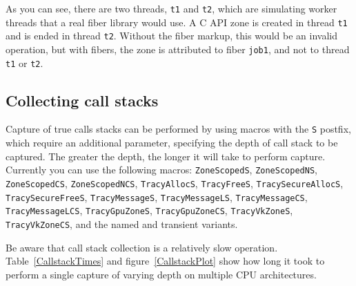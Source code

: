 \documentclass[hidelinks,titlepage,a4paper,twoside]{article}
\begin{document}
As you can see, there are two threads, \texttt{t1} and \texttt{t2}, which are simulating worker threads that a real fiber library would use. A C API zone is created in thread \texttt{t1} and is ended in thread \texttt{t2}. Without the fiber markup, this would be an invalid operation, but with fibers, the zone is attributed to fiber \texttt{job1}, and not to thread \texttt{t1} or \texttt{t2}.

\subsection{Collecting call stacks}
\label{collectingcallstacks}

Capture of true calls stacks can be performed by using macros with the \texttt{S} postfix, which require an additional parameter, specifying the depth of call stack to be captured. The greater the depth, the longer it will take to perform capture. Currently you can use the following macros: \texttt{ZoneScopedS}, \texttt{ZoneScopedNS}, \texttt{ZoneScopedCS}, \texttt{ZoneScopedNCS}, \texttt{TracyAllocS}, \texttt{TracyFreeS}, \texttt{TracySecureAllocS}, \texttt{TracySecureFreeS}, \texttt{TracyMessageS}, \texttt{TracyMessageLS}, \texttt{TracyMessageCS}, \texttt{TracyMessageLCS}, \texttt{TracyGpuZoneS}, \texttt{TracyGpuZoneCS}, \texttt{TracyVkZoneS}, \texttt{TracyVkZoneCS}, and the named and transient variants.

Be aware that call stack collection is a relatively slow operation. Table~\ref{CallstackTimes} and figure~\ref{CallstackPlot} show how long it took to perform a single capture of varying depth on multiple CPU architectures.
\end{document}
